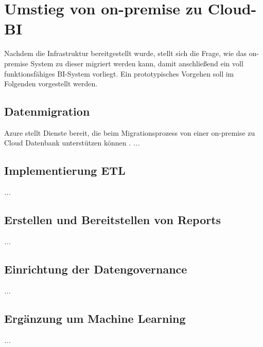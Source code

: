 \section{Umstieg von on-premise zu Cloud-BI} \label{sec:praktischeUmsetzung:Migration}
Nachdem die Infrastruktur bereitgestellt wurde, stellt sich die Frage, wie das on-premise System zu dieser migriert werden kann, damit anschließend ein voll funktionsfähiges BI-System vorliegt. Ein prototypisches Vorgehen soll im Folgenden vorgestellt werden.

\subsection{Datenmigration}
Azure stellt Dienste bereit, die beim Migrationsprozess von einer on-premise zu Cloud Datenbank unterstützen können \cite{chilberto_building_2020}. 
\textit{...}

\subsection{Implementierung ETL}
\textit{...}

\subsection{Erstellen und Bereitstellen von Reports}
\textit{...}

\subsection{Einrichtung der Datengovernance}
\textit{...}

\subsection{Ergänzung um Machine Learning}
\textit{...}